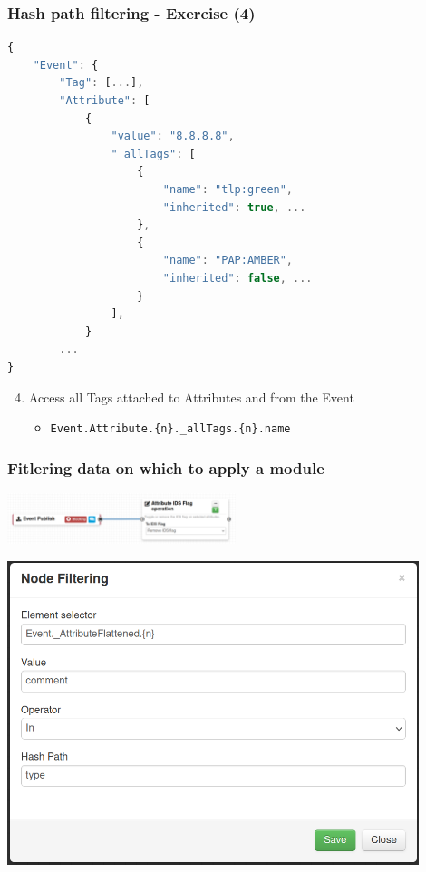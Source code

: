 \begin{frame}[fragile]
    \frametitle{Hash path filtering - Exercise (4)}

\begin{lstlisting}[language=javascript,firstnumber=1]
{
    "Event": {
        "Tag": [...],
        "Attribute": [
            {
                "value": "8.8.8.8",
                "_allTags": [
                    {
                        "name": "tlp:green",
                        "inherited": true, ...
                    },
                    {
                        "name": "PAP:AMBER",
                        "inherited": false, ...
                    }
                ],
            }
        ...
}
\end{lstlisting}
    \begin{enumerate}
        \setcounter{enumi}{3}
        \item Access all Tags attached to Attributes and from the Event
        \begin{itemize}
            \item \texttt{Event.Attribute.\{n\}.\_allTags.\{n\}.name}
        \end{itemize}
    \end{enumerate}
\end{frame}

\begin{frame}
    \frametitle{Fitlering data on which to apply a module}
    \begin{center}
        \includegraphics[width=0.5\textwidth]{pictures/remove-ids-3.png}
    \end{center}
    \begin{center}
        \includegraphics[width=0.9\textwidth]{pictures/remove-ids-2.png}
    \end{center}
\end{frame}


